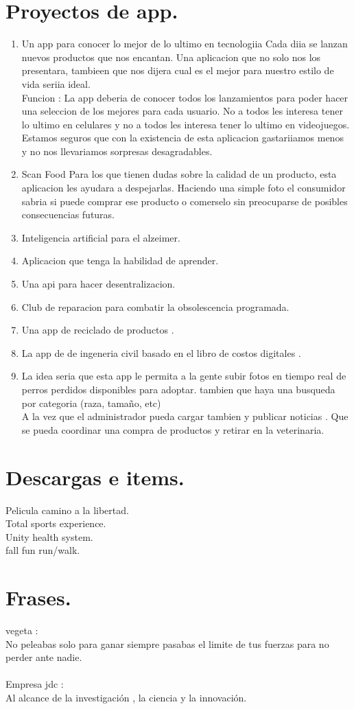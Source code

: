 \documentclass[10pt,fleqn,x11names,table]{article}
\begin{document}
\section{Proyectos de app.}
\begin{enumerate}
	\item Un app para conocer lo mejor de lo ultimo en tecnologiia
	Cada diia se lanzan nuevos productos que nos encantan. Una aplicacion que no solo nos los presentara, tambieen que nos dijera cual es el mejor para nuestro estilo de vida seriia ideal.\\
	Funcion : La app deberia de conocer todos los lanzamientos para poder hacer una seleccion de los mejores para cada usuario. No a todos les interesa tener lo ultimo en celulares y no a todos les interesa tener lo ultimo en videojuegos. Estamos seguros que con la existencia de esta aplicacion gastariiamos menos y no nos llevariamos sorpresas desagradables.
	\item Scan Food
	Para los que tienen dudas sobre la calidad de un producto, esta aplicacion les ayudara a despejarlas. Haciendo una simple foto el consumidor sabria si puede comprar ese producto o comerselo sin preocuparse de posibles consecuencias futuras.
	\item Inteligencia artificial para el alzeimer.
	\item Aplicacion que tenga la habilidad de aprender. 
	\item Una api para hacer desentralizacion.
	\item Club de reparacion  para combatir la obsolescencia programada.
	\item Una app de reciclado de productos .
	\item La app de de ingeneria  civil  basado en el libro de costos digitales .
	\item La idea seria que esta app le permita a la gente subir fotos en tiempo real de perros perdidos disponibles para adoptar. tambien que haya una busqueda por categoria (raza, tama\~no, etc)\\
	A la vez que el administrador pueda cargar tambien y publicar noticias .
	Que se pueda coordinar una compra de productos y retirar en la veterinaria.
\end{enumerate}

\section{Descargas e items.}
Pelicula camino a la libertad.\\
Total sports experience.\\
Unity health system.\\
fall fun run/walk.
\section{Frases.}
vegeta :\\
No peleabas solo para ganar siempre pasabas el limite 
de tus fuerzas para no perder ante nadie.\\\\
Empresa jdc :\\
Al alcance de la investigaci\'on , la ciencia y la innovaci\'on.
\end{document}

